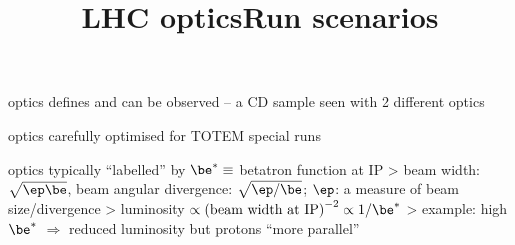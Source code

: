 \newpage %
\title{LHC optics}

\> optics defines  and  can be observed -- a CD sample seen with 2 different optics

\vskip2mm


\vfil
\> optics carefully optimised for TOTEM special runs

\vfil
\> optics typically ``labelled'' by $\be^* \equiv$ betatron function at IP
\>> beam width: $\sqrt{\ep \be}$, beam angular divergence: $\sqrt{\ep / \be}$; $\ep$: a measure of beam size/divergence
\>> luminosity $\propto \hbox{(beam width at IP)}^{-2} \propto 1/\be^*$
\>> example: \cYe high $\be^*$ $\Rightarrow$ reduced luminosity but protons ``more parallel''\cFg


\newpage %
\title{Run scenarios}

